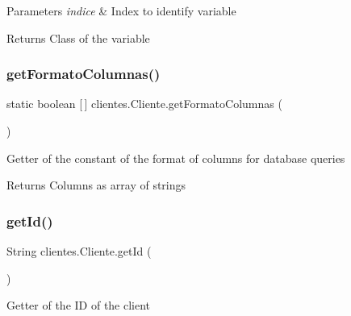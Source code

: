 \begin{DoxyParams}{Parameters}
{\em indice} & Index to identify variable \\
\hline
\end{DoxyParams}
\begin{DoxyReturn}{Returns}
Class of the variable 
\end{DoxyReturn}
\mbox{\label{classclientes_1_1_cliente_a3e27faa4e105a87dad7a4dd3f01f2c4c}} 
\subsubsection{\texorpdfstring{get\+Formato\+Columnas()}{getFormatoColumnas()}}
{\footnotesize\ttfamily static boolean \mbox{[}$\,$\mbox{]} clientes.\+Cliente.\+get\+Formato\+Columnas (\begin{DoxyParamCaption}{ }\end{DoxyParamCaption})\hspace{0.3cm}{\ttfamily [static]}}

Getter of the constant of the format of columns for database queries

\begin{DoxyReturn}{Returns}
Columns as array of strings 
\end{DoxyReturn}
\mbox{\label{classclientes_1_1_cliente_afbd9530580077a88e7b5f0522d56ee6f}} 
\subsubsection{\texorpdfstring{get\+Id()}{getId()}}
{\footnotesize\ttfamily String clientes.\+Cliente.\+get\+Id (\begin{DoxyParamCaption}{ }\end{DoxyParamCaption})}

Getter of the ID of the client

